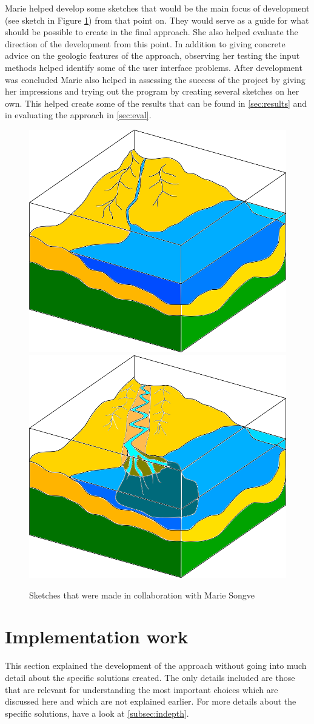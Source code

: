 \documentclass[a4paper,12pt]{report}
\newcommand{\secref}[1]{\autoref{#1}}
\begin{document}

Marie helped develop some sketches that would be the main focus of development (see sketch in Figure \ref{fig:illuSketch}) from that point on. They would serve as a guide for what should be possible to create in the final approach. She also helped evaluate the direction of the development from this point. In addition to giving concrete advice on the geologic features of the approach, observing her testing the input methods helped identify some of the user interface problems. After development was concluded Marie also helped in assessing the success of the project by giving her impressions and trying out the program by creating several sketches on her own. This helped create some of the results that can be found in \secref{sec:results} and in evaluating the approach in \secref{sec:eval}. 

\begin{figure}
 \centering
\includegraphics[width=.4\linewidth]{thesis/illuSketch1.png}
\includegraphics[width=.4\linewidth]{thesis/illuSketch2.png}
 \caption{Sketches that were made in collaboration with Marie Songve}
 \label{fig:illuSketch}
\end{figure}

\section{Implementation work}

This section explained the development of the approach without going into much detail about the specific solutions created. The only details included are those that are relevant for understanding the most important choices which are discussed here and which are not explained earlier. For more details about the specific solutions, have a look at \secref{subsec:indepth}.
\end{document}
